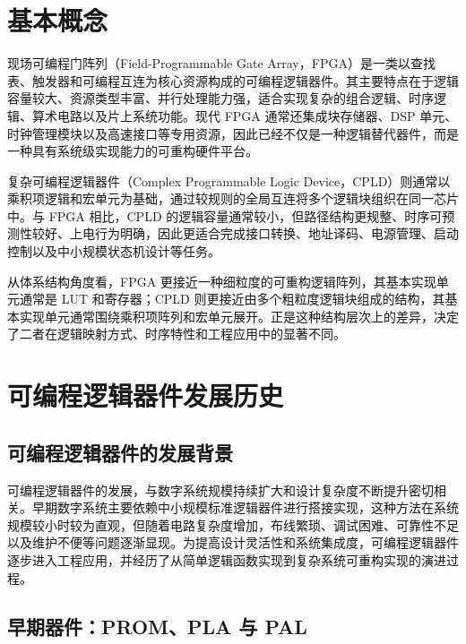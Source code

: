 \section{基本概念}\label{ux57faux672cux6982ux5ff5}

现场可编程门阵列（Field-Programmable Gate
Array，FPGA）是一类以查找表、触发器和可编程互连为核心资源构成的可编程逻辑器件。其主要特点在于逻辑容量较大、资源类型丰富、并行处理能力强，适合实现复杂的组合逻辑、时序逻辑、算术电路以及片上系统功能。现代
FPGA 通常还集成块存储器、DSP
单元、时钟管理模块以及高速接口等专用资源，因此已经不仅是一种逻辑替代器件，而是一种具有系统级实现能力的可重构硬件平台。

复杂可编程逻辑器件（Complex Programmable Logic
Device，CPLD）则通常以乘积项逻辑和宏单元为基础，通过较规则的全局互连将多个逻辑块组织在同一芯片中。与
FPGA 相比，CPLD
的逻辑容量通常较小，但路径结构更规整、时序可预测性较好、上电行为明确，因此更适合完成接口转换、地址译码、电源管理、启动控制以及中小规模状态机设计等任务。

从体系结构角度看，FPGA
更接近一种细粒度的可重构逻辑阵列，其基本实现单元通常是 LUT
和寄存器；CPLD
则更接近由多个粗粒度逻辑块组成的结构，其基本实现单元通常围绕乘积项阵列和宏单元展开。正是这种结构层次上的差异，决定了二者在逻辑映射方式、时序特性和工程应用中的显著不同。

\section{可编程逻辑器件发展历史}\label{ux53efux7f16ux7a0bux903bux8f91ux5668ux4ef6ux53d1ux5c55ux5386ux53f2}

\subsection{可编程逻辑器件的发展背景}\label{ux53efux7f16ux7a0bux903bux8f91ux5668ux4ef6ux7684ux53d1ux5c55ux80ccux666f}

可编程逻辑器件的发展，与数字系统规模持续扩大和设计复杂度不断提升密切相关。早期数字系统主要依赖中小规模标准逻辑器件进行搭接实现，这种方法在系统规模较小时较为直观，但随着电路复杂度增加，布线繁琐、调试困难、可靠性不足以及维护不便等问题逐渐显现。为提高设计灵活性和系统集成度，可编程逻辑器件逐步进入工程应用，并经历了从简单逻辑函数实现到复杂系统可重构实现的演进过程。

\subsection{早期器件：PROM、PLA 与
PAL}\label{ux65e9ux671fux5668ux4ef6prompla-ux4e0e-pal}

